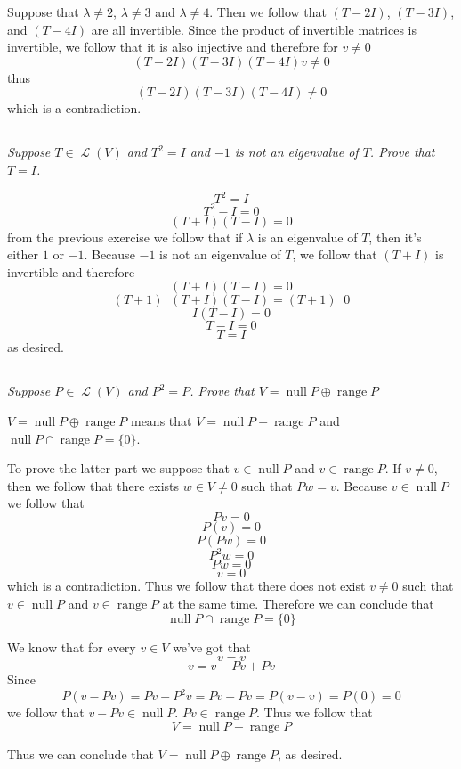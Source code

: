 \documentclass[11pt,oneside,titlepage]{book}
\DeclareMathOperator \map {\mathcal {L}}
\DeclareMathOperator \ns {null}
\DeclareMathOperator \range {range}
\DeclareMathOperator \inv {^{-1}}
\begin{document}
Suppose that $\lambda \neq 2$, $\lambda \neq 3$ and $\lambda \neq 4$. Then we follow that
$(T - 2I)$, $(T - 3I)$, and $(T - 4I)$ are all invertible. Since the product of invertible
matrices is invertible, we follow that it is also injective and therefore for $v \neq 0$
$$(T - 2I)(T - 3I)(T - 4I)v \neq 0$$
thus
$$(T - 2I)(T - 3I)(T - 4I) \neq 0$$
which is a contradiction.

\subsection{}

\textit{Suppose $T \in \map(V)$ and $T^2 = I$ and $-1$ is not an eigenvalue of $T$. Prove that
  $T = I$.}

$$T^2 = I$$
$$T^2 - I = 0$$
$$(T + I)(T - I) = 0$$
from the previous exercise we follow that if $\lambda$ is an eigenvalue of $T$, then it's either
$1$ or $-1$. Because $-1$ is not an eigenvalue of $T$, we follow that $(T + I)$ is invertible
and therefore
$$(T + I)(T - I) = 0$$
$$(T + 1)\inv(T + I)(T - I) = (T + 1)\inv 0$$
$$I(T - I) = 0$$
$$T - I = 0$$
$$T = I$$
as desired.

\subsection{}

\textit{Suppose $P \in \map(V)$ and $P^2 = P$. Prove that $V = \ns P \oplus \range P$}

$V = \ns P \oplus \range P$ means that $V = \ns P + \range P$ and $\ns P \cap \range P = \{0\}$.

To prove the latter part  we
suppose that $v \in \ns P$ and $v \in \range P$. If $v \neq 0$, then we follow that
there exists $w \in V \neq 0$ such that $Pw = v$. Because $v \in \ns P$ we follow that
$$Pv = 0$$
$$P(v) = 0$$
$$P(Pw) = 0$$
$$P^2w = 0$$
$$Pw = 0$$
$$v = 0$$
which is a contradiction. Thus we follow that there does not exist $v \neq 0$ such that
$v \in \ns P$ and $v \in \range P$ at the same time. Therefore we can conclude that
$$\ns P \cap \range P = \{0\}$$

We know that for every $v \in V$ we've got that 
$$v = v$$
$$v = v - Pv + Pv $$
Since
$$P(v - Pv) = Pv - P^2v = Pv - Pv = P(v - v) = P(0) = 0$$
we follow that $v - Pv \in \ns P$. $Pv \in \range P$. Thus we follow that
$$V = \ns P + \range P$$


Thus we can conclude that $V = \ns P \oplus \range P$, as desired.


\subsection{}
\end{document}
